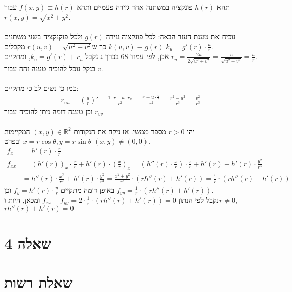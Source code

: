 \documentclass{article}
\def\reals{\mathbb{R}}
\begin{document}
תהא $h(r)$ פונקציה במשתנה אחד גזירה פעמיים ותהא $f(x,y)\equiv h(r)$ עבור $r(x,y)=\sqrt{x^2+y^2}$.\\\\
נוכיח את טענת העזר הבאה: לכל פונקציה גזירה $g(r)$ ולכל פוקנקציה בשני משתנים $k(u,v)\equiv g(r)$ כך ש$r(u,v)=\sqrt{u^2+v^2}$ מקבלים $k_u=g'(r) \cdot \frac{u}{r}$. \\
אכן, לפי עמוד 68 בכרך ג נקבל $k_u=g'(r)+r_u$, ומתקיים $r_u=\frac{2u}{2\sqrt{u^2+v^2}}=\frac{u}{\sqrt{u^2+v^2}}=\frac{u}{r}$. \\
בנקל נוכל להוכיח טענה זהה עבור $v$.\\\\
כמו כן נשים לב כי מתקיים:
\begin{align*}
    r_{uu}=(\frac{u}{r})'=\frac{1\cdot r-u\cdot r_u}{r^2}=\frac{r-u\cdot \frac{u}{r}}{r^2}=\frac{r^2-u^2}{r^3}=\frac{v^2}{r^3}
\end{align*}
וכן טענה דומה ניתן להוכיח עבור $r_{vv}$
\\\\
יהי $r>0$ מספר ממשי. אז ניקח את הנקודות $(x,y)\in \reals^2$ המקיימות $x=r\cos \theta, y = r\sin \theta$ ובפרט $(x,y)\ne (0,0)$. \\
\begin{align*}
    f_x    & = h'(r) \cdot \frac{x}{r}                                                 \\
    f_{xx} & = (h'(r))_x \cdot \frac{x}{r} + h'(r) \cdot (\frac{x}{r})_x =
    (h''(r) \cdot \frac{x}{r}) \cdot \frac{x}{r} + h'(r)+h'(r) \cdot \frac{y^2}{r^3} = \\
           & = h''(r) \cdot \frac{x^2}{r^2} + h'(r) \cdot \frac{y^2}{r^3} =
    \frac{x^2+y^2}{r^3} \cdot (rh''(r)+h'(r)) = \frac{1}{r} \cdot (rh''(r)+h'(r))
\end{align*}
באופן דומה מתקיים $f_y=h'(r)\cdot \frac{y}{r}$ וכן $f_{yy}=\frac{1}{r} \cdot (rh''(r)+h'(r))$.\\
נקבל לפי הנתון $f_{xx}+f_{yy}=2\cdot \frac{1}{r} \cdot (rh''(r)+h'(r))=0$ ומכאן, היות ו$r\ne 0$, $rh''(r)+h'(r)=0$

\pagebreak

\section*{שאלה 4}

\pagebreak

\section*{שאלת רשות}
\end{document}

